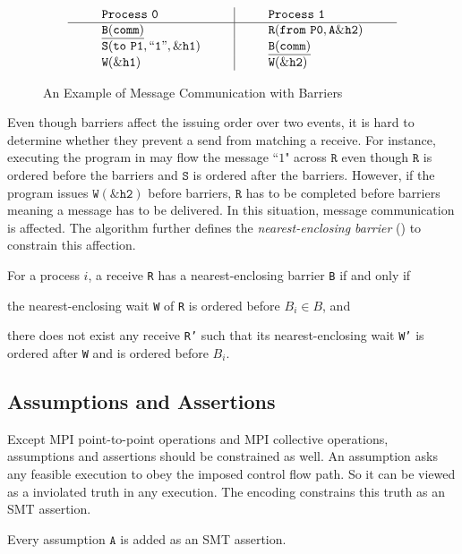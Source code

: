 \begin{figure}[h]
\[
\begin{array}{l|l}
\;\;\;\;\;\;\;\;\mathtt{Process\ 0}\;\;\;\;\;\;\;\; & \;\;\;\;\;\;\;\; \mathtt{Process\ 1}\;\;\;\;\;\;\;\; \\
\hline
\;\;\;\;\;\;\;\;\mathtt{\underline{B(comm)}}\;\;\;\;\;\;\;\; & \;\;\;\;\;\;\;\; \mathtt{R(from\ P0,A\&h2)}\;\;\;\;\;\;\;\; \\
\;\;\;\;\;\;\;\;\mathtt{S(to\ P1,``1",\&h1)}\;\;\;\;\;\;\;\; & \;\;\;\;\;\;\;\; \mathtt{\underline{B(comm)}}\;\;\;\;\;\;\;\; \\
\;\;\;\;\;\;\;\;\mathtt{W(\&h1)}\;\;\;\;\;\;\;\; & \;\;\;\;\;\;\;\; \mathtt{W(\&h2)}\;\;\;\;\;\;\;\; \\
\end{array}
\]
\caption{An Example of Message Communication with Barriers} \label{fig:mc_barrier1}
\end{figure}

Even though barriers affect the issuing order over two events, it is hard to determine whether they prevent a send from matching a receive. For instance, executing the program in  may flow the message ``$1$" across $\mathtt{R}$ even though $\mathtt{R}$ is ordered before the barriers and $\mathtt{S}$ is ordered after the barriers. However, if the program issues $\mathtt{W(\&h2)}$ before barriers, $\mathtt{R}$ has to be completed before barriers meaning a message has to be delivered. In this situation, message communication is affected. The algorithm further defines the \textit{nearest-enclosing barrier} () to constrain this affection.

\begin{definition}\label{def:nb}
For a process $i$, a receive \texttt{R} has a nearest-enclosing barrier \texttt{B} if and only if
\begin{compactenum}
\item the nearest-enclosing wait \texttt{W} of \texttt{R} is ordered before $B_i\in B$, and
\item there does not exist any receive \texttt{R'} such that its nearest-enclosing wait \texttt{W'} is ordered after \texttt{W} and is ordered before $B_i$.
\end{compactenum}
\end{definition}


\subsection{Assumptions and Assertions}
Except MPI point-to-point operations and MPI collective operations, assumptions and assertions should be constrained as well. An assumption asks any feasible execution to obey the imposed control flow path. So it can be viewed as a inviolated truth in any execution. The encoding constrains this truth as an SMT assertion.
\begin{definition}[Assumption] \label{def:assm}
Every assumption $\mathtt{A}$ is added as an SMT assertion.
\end{definition}

